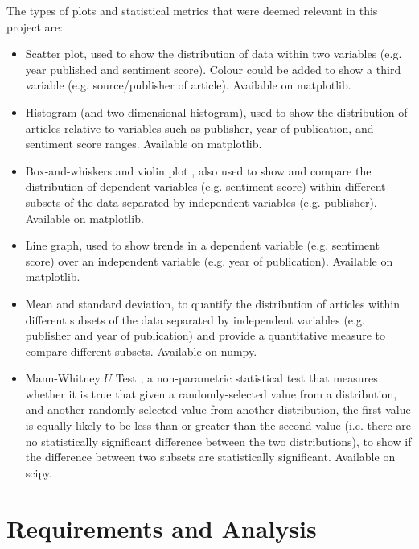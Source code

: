 \documentclass{report}
\begin{document}
The types of plots and statistical metrics that were deemed relevant in this project are:
\begin{itemize}
	\item Scatter plot, used to show the distribution of data within two variables (e.g. year published and sentiment score). 
		Colour could be added to show a third variable (e.g. source/publisher of article).
		Available on matplotlib.
	\item Histogram (and two-dimensional histogram), used to show the distribution of articles relative to variables such as publisher, year of publication, and sentiment score ranges. 
		Available on matplotlib.
	\item Box-and-whiskers \cite{tukey1977exploratory} and violin plot \cite{hintze1998violin}, also used to show and compare the distribution of dependent variables (e.g. sentiment score) within different subsets of the data separated by independent variables (e.g. publisher).
		Available on matplotlib.
	\item Line graph, used to show trends in a dependent variable (e.g. sentiment score) over an independent variable (e.g. year of publication).
		Available on matplotlib.
	\item Mean and standard deviation, to quantify the distribution of articles within different subsets of the data separated by independent variables (e.g. publisher and year of publication) and provide a quantitative measure to compare different subsets.
		Available on numpy.
	\item Mann-Whitney $U$ Test \cite{mann1947test}, a non-parametric statistical test that measures whether it is true that given a randomly-selected value from a distribution, and another randomly-selected value from another distribution, the first value is equally likely to be less than or greater than the second value (i.e. there are no statistically significant difference between the two distributions), to show if the difference between two subsets are statistically significant.
		Available on scipy.
\end{itemize}

\chapter{Requirements and Analysis} \label{Requirements and Analysis}  %

\end{document}
